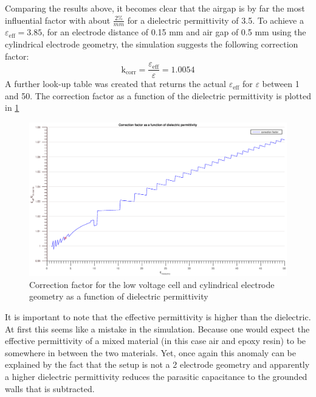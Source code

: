 Comparing the results above, it becomes clear that the airgap is by
far the most influential factor with about $\frac{2\%}{mm}$ for a dielectric permittivity of 3.5.
To achieve a $\varepsilon_{\textrm{eff}}=3.85$, for an electrode distance of 0.15 mm and air gap of 0.5 mm using the
cylindrical electrode geometry, the simulation
suggests the following correction factor:
\begin{equation}
  \mathrm{k_{corr}}=\frac{\varepsilon_{\textrm{eff}}}{\varepsilon}=1.0054
\end{equation}
A further look-up table was created that returns the actual $\varepsilon_{\textrm{eff}}$ for $\varepsilon$ between 1 and 50.
The correction factor as a function of the dielectric permittivity is plotted in \ref{fig.correctionfactor}

\begin{figure}[htbp]
	\centering
	\centerline{\includegraphics[width=\textwidth]{figures/Results/Correction/correction.eps}}		
	\caption[Kurze Abbildungsbeschreibung]{Correction factor for the low voltage cell and cylindrical electrode geometry as a function of dielectric permittivity } 
	\label{fig.correctionfactor}
\end{figure}


It is important to note that the effective permittivity is higher than the dielectric. At first this seems
like a mistake in the simulation. Because one would expect the effective permittivity of a 
mixed material (in this case air and epoxy resin) to be somewhere in between the two materials.
Yet, once again this anomaly can be explained by
the fact that the setup is not a 2 electrode geometry and apparently a higher dielectric permittivity
reduces the parasitic capacitance to the grounded walls that is subtracted.



